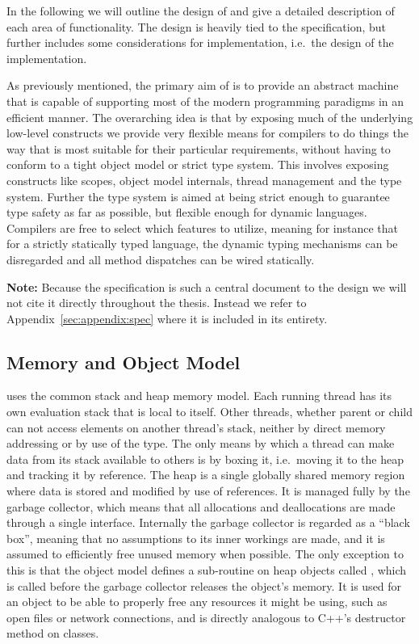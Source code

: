 In the following we will outline the design of \thename{} and give a detailed
description of each area of functionality. The design is heavily tied to the
\thename{} specification, but further includes some considerations for
implementation, i.e.~the design of the implementation.

As previously mentioned, the primary aim of \thename{} is to provide an abstract
machine that is capable of supporting most of the modern programming paradigms
in an efficient manner. The overarching idea is that by exposing much of the
underlying low-level constructs we provide very flexible means for compilers to
do things the way that is most suitable for their particular requirements,
without having to conform to a tight object model or strict type system. This
involves exposing constructs like scopes, object model internals, thread
management and the type system. Further the type system is aimed at being strict
enough to guarantee type safety as far as possible, but flexible enough for
dynamic languages. Compilers are free to select which features to utilize,
meaning for instance that for a strictly statically typed language, the dynamic
typing mechanisms can be disregarded and all method dispatches can be wired
statically.

\textbf{Note:} Because the specification is such a central document to the
design we will not cite it directly throughout the thesis. Instead we refer to
Appendix~\ref{sec:appendix:spec} where it is included in its entirety.

\subsection{Memory and Object Model}
\label{sec:design:object-model}

\thename{} uses the common stack and heap memory model. Each running thread has
its own evaluation stack that is local to itself. Other threads, whether parent
or child can not access elements on another thread's stack, neither by direct
memory addressing or by use of the  type. The only means by
which a thread can make data from its stack available to others is by boxing it,
i.e.~moving it to the heap and tracking it by reference. The heap is a single
globally shared memory region where data is stored and modified by use of
references. It is managed fully by the garbage collector, which means that all
allocations and deallocations are made through a single interface. Internally
the garbage collector is regarded as a ``black box'', meaning that no
assumptions to its inner workings are made, and it is assumed to efficiently
free unused memory when possible. The only exception to this is that the object
model defines a sub-routine on heap objects called , which is
called before the garbage collector releases the object's memory. It is used for
an object to be able to properly free any resources it might be using, such as
open files or network connections, and is directly analogous to C++'s destructor
method on classes.

